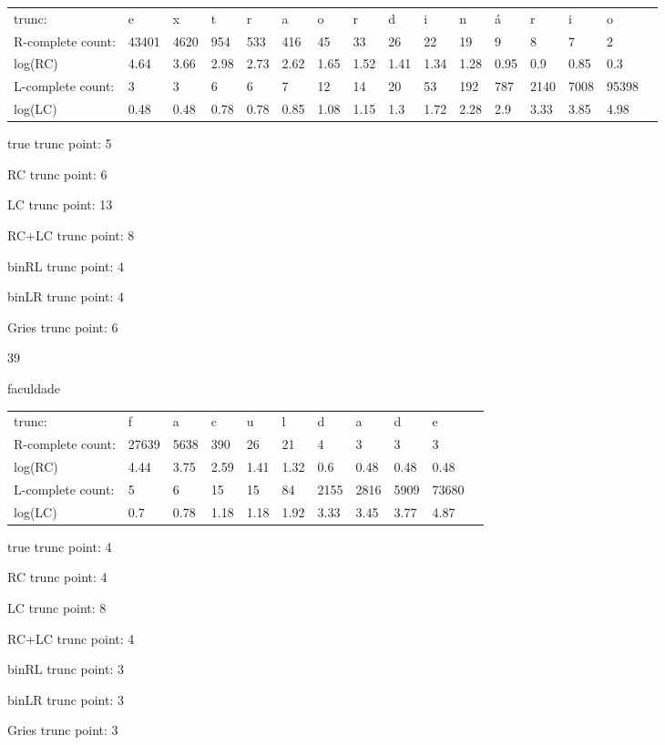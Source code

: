 \documentclass[10pt]{article}
\begin{document}
\begin{tabular}{l|lllllllllllllll}
trunc: & e & x & t & r & a & o & r & d & i & n & á & r & i & o & \\ 
R-complete count: & 43401 & 4620 & 954 & 533 & 416 & 45 & 33 & 26 & 22 & 19 & 9 & 8 & 7 & 2 & \\ 
log(RC) & 4.64 & 3.66 & 2.98 & 2.73 & 2.62 & 1.65 & 1.52 & 1.41 & 1.34 & 1.28 & 0.95 & 0.9 & 0.85 & 0.3 & \\ 
L-complete count: & 3 & 3 & 6 & 6 & 7 & 12 & 14 & 20 & 53 & 192 & 787 & 2140 & 7008 & 95398 & \\ 
log(LC) & 0.48 & 0.48 & 0.78 & 0.78 & 0.85 & 1.08 & 1.15 & 1.3 & 1.72 & 2.28 & 2.9 & 3.33 & 3.85 & 4.98 & \\ 
\end{tabular}

true trunc point: 5

RC trunc point: 6

LC trunc point: 13

RC+LC trunc point: 8

binRL trunc point: 4

binLR trunc point: 4

Gries trunc point: 6

\vspace{1em}

39

faculdade

\begin{tabular}{l|llllllllll}
trunc: & f & a & c & u & l & d & a & d & e & \\ 
R-complete count: & 27639 & 5638 & 390 & 26 & 21 & 4 & 3 & 3 & 3 & \\ 
log(RC) & 4.44 & 3.75 & 2.59 & 1.41 & 1.32 & 0.6 & 0.48 & 0.48 & 0.48 & \\ 
L-complete count: & 5 & 6 & 15 & 15 & 84 & 2155 & 2816 & 5909 & 73680 & \\ 
log(LC) & 0.7 & 0.78 & 1.18 & 1.18 & 1.92 & 3.33 & 3.45 & 3.77 & 4.87 & \\ 
\end{tabular}

true trunc point: 4

RC trunc point: 4

LC trunc point: 8

RC+LC trunc point: 4

binRL trunc point: 3

binLR trunc point: 3

Gries trunc point: 3
\end{document}
